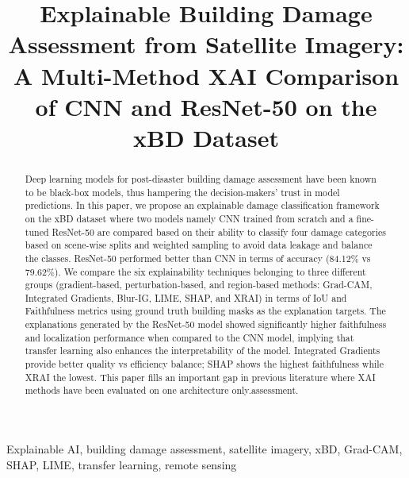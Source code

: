 \documentclass[conference]{IEEEtran}
\begin{document}
\title{Explainable Building Damage Assessment from Satellite Imagery: A Multi-Method XAI Comparison of CNN and ResNet-50 on the xBD Dataset}



\maketitle

\begin{abstract}
Deep learning models for post-disaster building damage assessment have been known to be black-box models, thus hampering the decision-makers' trust in model predictions. In this paper, we propose an explainable damage classification framework on the xBD dataset where two models namely CNN trained from scratch and a fine-tuned ResNet-50 are compared based on their ability to classify four damage categories based on scene-wise splits and weighted sampling to avoid data leakage and balance the classes. ResNet-50 performed better than CNN in terms of accuracy (84.12\% vs 79.62\%). We compare the six explainability techniques belonging to three different groups (gradient-based, perturbation-based, and region-based methods: Grad-CAM, Integrated Gradients, Blur-IG, LIME, SHAP, and XRAI) in terms of IoU and Faithfulness metrics using ground truth building masks as the explanation targets. The explanations generated by the ResNet-50 model showed significantly higher faithfulness and localization performance when compared to the CNN model, implying that transfer learning also enhances the interpretability of the model. Integrated Gradients provide better quality vs efficiency balance; SHAP shows the highest faithfulness while XRAI the lowest. This paper fills an important gap in previous literature where XAI methods have been evaluated on one architecture only.assessment.

\end{abstract}

\begin{IEEEkeywords}
Explainable AI, building damage assessment, satellite imagery, xBD, Grad-CAM, SHAP, LIME, transfer learning, remote sensing
\end{IEEEkeywords}

\end{document}
